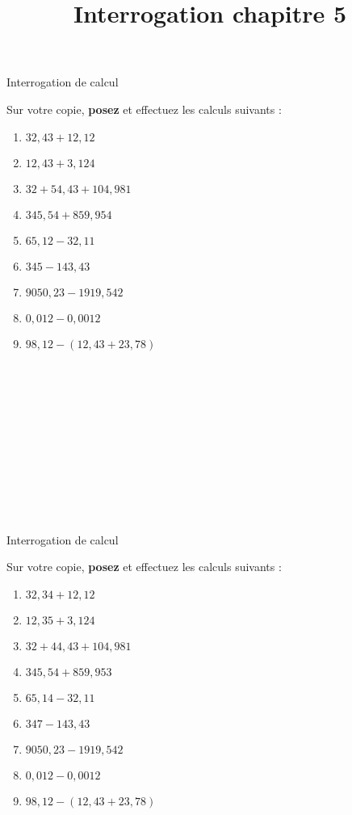 \documentclass[14 pt]{extarticle}
\title{Interrogation chapitre 5}
\date{}
\theoremstyle{plain}
\begin{document}
\begin{center}{\Large Interrogation de calcul}\\ 
 \end{center}
 
 Sur votre copie, \textbf{posez} et effectuez les calculs suivants : 
 \begin{enumerate}
 \item $32, 43 + 12, 12$ %
 \item $12, 43 + 3, 124$ %
 \item $32 + 54, 43 + 104, 981$ %
 \item $ 345, 54 + 859, 954$ %
 \item $65, 12 - 32, 11$ %
 \item $ 345 - 143, 43$ %
 \item $ 9050, 23 - 1919, 542$ %
 \item $0, 012 -0, 0012$ %
 \item $98,12 - ( 12, 43 + 23, 78)$
 \end{enumerate}

 \ \\ \ \\ \ \\ \ \\ \ \\ 
 \ \\ \ \\ \ \\ \ \\ \ \\ 
 
 \begin{center}{\Large Interrogation de calcul}\\ 
 \end{center}
 
 Sur votre copie, \textbf{posez} et effectuez les calculs suivants : 
 \begin{enumerate}
 \item $32, 34 + 12, 12$ %
 \item $12, 35 + 3, 124$ %
 \item $32 + 44, 43 + 104, 981$ %
 \item $ 345, 54 + 859, 953$ %
 \item $65, 14 - 32, 11$ %
 \item $ 347 - 143, 43$ %
 \item $ 9050, 23 - 1919, 542$ %
 \item $0, 012 -0, 0012$ %
 \item $98,12 - ( 12, 43 + 23, 78)$
 \end{enumerate}
 	
\end{document}
